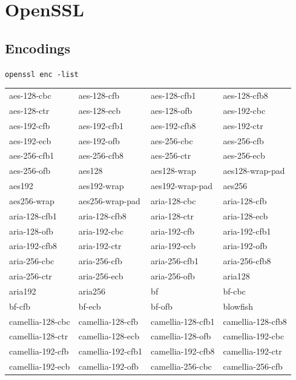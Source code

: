 \documentclass[a4paper, 12pt]{book} %
\begin{document}
\chapter{OpenSSL}



\section{Encodings}

\verb|openssl enc -list|


\begin{table}[H]
\centering
\small
\begin{tabular}{llll}
\hline
aes-128-cbc & aes-128-cfb & aes-128-cfb1 & aes-128-cfb8 \\
aes-128-ctr & aes-128-ecb & aes-128-ofb & aes-192-cbc \\
aes-192-cfb & aes-192-cfb1 & aes-192-cfb8 & aes-192-ctr \\
aes-192-ecb & aes-192-ofb & aes-256-cbc & aes-256-cfb \\
aes-256-cfb1 & aes-256-cfb8 & aes-256-ctr & aes-256-ecb \\
aes-256-ofb & aes128 & aes128-wrap & aes128-wrap-pad \\
aes192 & aes192-wrap & aes192-wrap-pad & aes256 \\
aes256-wrap & aes256-wrap-pad & aria-128-cbc & aria-128-cfb \\
aria-128-cfb1 & aria-128-cfb8 & aria-128-ctr & aria-128-ecb \\
aria-128-ofb & aria-192-cbc & aria-192-cfb & aria-192-cfb1 \\
aria-192-cfb8 & aria-192-ctr & aria-192-ecb & aria-192-ofb \\
aria-256-cbc & aria-256-cfb & aria-256-cfb1 & aria-256-cfb8 \\
aria-256-ctr & aria-256-ecb & aria-256-ofb & aria128 \\
aria192 & aria256 & bf & bf-cbc \\
bf-cfb & bf-ecb & bf-ofb & blowfish \\
camellia-128-cbc & camellia-128-cfb & camellia-128-cfb1 & camellia-128-cfb8 \\
camellia-128-ctr & camellia-128-ecb & camellia-128-ofb & camellia-192-cbc \\
camellia-192-cfb & camellia-192-cfb1 & camellia-192-cfb8 & camellia-192-ctr \\
camellia-192-ecb & camellia-192-ofb & camellia-256-cbc & camellia-256-cfb \\

\end{tabular}
\end{table}
\end{document}
